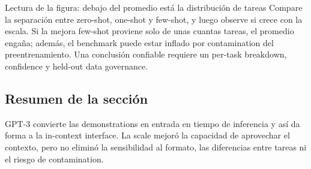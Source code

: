 
\begin{knowledgebox}{Lectura de la figura: debajo del promedio está la distribución de tareas}
Compare la separación entre zero-shot, one-shot y few-shot, y luego observe si crece con la escala. Si la mejora few-shot proviene solo de unas cuantas tareas, el promedio engaña; además, el benchmark puede estar inflado por contamination del preentrenamiento. Una conclusión confiable requiere un per-task breakdown, confidence y held-out data governance.
\end{knowledgebox}


\subsection{Resumen de la sección}

GPT-3 convierte las demonstrations en entrada en tiempo de inferencia y así da forma a la in-context interface. La scale mejoró la capacidad de aprovechar el contexto, pero no eliminó la sensibilidad al formato, las diferencias entre tareas ni el riesgo de contamination.
